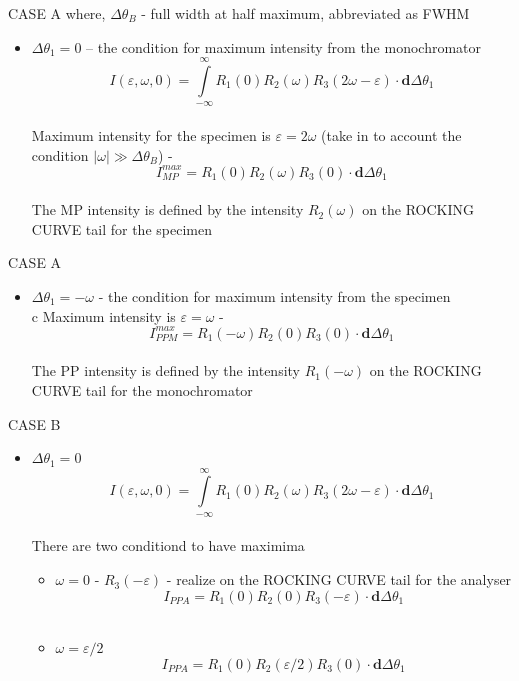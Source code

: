 \documentclass{beamer}
\begin{document}
\begin{frame}{CASE A }
where, $\Delta \theta_B $ - full width at half maximum, abbreviated as FWHM\\
\begin{itemize}
\item $\Delta \theta_1 = 0$ – the condition for maximum intensity from the monochromator  \\ 
$$I(\varepsilon,\omega, 0) = \int\limits_{-\infty}^\infty R_1 (0)
R_2(\omega)R_3(2\omega - \varepsilon) \cdot \pmb{d}\Delta\theta_1$$ \\
Maximum intensity for the specimen is $\varepsilon = 2 \omega$ (take in to account the condition $|\omega| \gg \Delta \theta_B $) - 
$$I_{MP}^{max} = R_1(0)R_2(\omega)R_3(0)\cdot \pmb{d}\Delta\theta_1$$\\
The MP intensity is defined by the intensity $R_2(\omega)$ on the ROCKING CURVE tail for the specimen
\end{itemize}
\end{frame}


\begin{frame}{CASE A }
\begin{itemize}
\item  $\Delta \theta_1 = -\omega$  - the condition for maximum intensity from the specimen \\
c
Maximum intensity is $\varepsilon = \omega$ - 
$$I_{PPM}^{max} = R_1(-\omega)R_2(0)R_3(0)\cdot \pmb{d}\Delta\theta_1$$\\
The PP intensity is defined by the intensity $R_1(-\omega)$ on the ROCKING CURVE tail for the monochromator
\end{itemize}
\end{frame}



\begin{frame}{CASE B }
\begin{itemize}
\item  $\Delta \theta_1 = 0$\\
$$I(\varepsilon, \omega, 0) = \int\limits_{-\infty}^\infty R_1(0)
R_2(\omega)R_3(2\omega - \varepsilon) \cdot \pmb{d}\Delta\theta_1$$ \\
There are two conditiond to have maximima 
\begin{itemize}
\item $\omega=0$ - $R_3(-\varepsilon)$  - realize on the ROCKING CURVE tail for the analyser \\
$$I_{PPA}= R_1(0)R_2(0)R_3(-\varepsilon)\cdot \pmb{d}\Delta\theta_1$$\\
\item $\omega = \varepsilon/2$ 
$$I_{PPA}= R_1(0)R_2(\varepsilon/2)R_3(0)\cdot \pmb{d}\Delta\theta_1$$
\end {itemize}
\end{itemize}
\end{frame}
\end{document}
